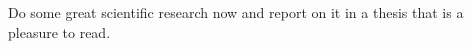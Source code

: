 \documentclass[german,version-2020-11]{uzl-thesis}
\begin{document}
Do some great scientific research now and report on it in a thesis
that is a pleasure to read. 




%














% 
%
%
%
% 
% 
%
%
%
%
% 
% 
%
%
%
%
% 
%
%
\end{document}
